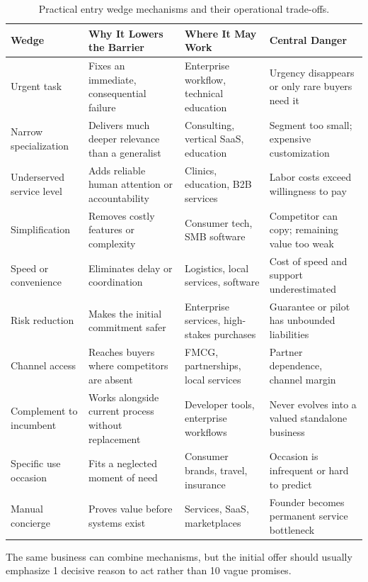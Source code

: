 \begin{table}[t]
\centering
\small
\begin{tabularx}{\textwidth}{l p{4.2cm} p{3.5cm} X}
\toprule
\textbf{Wedge} & \textbf{Why It Lowers the Barrier} & \textbf{Where It May Work} & \textbf{Central Danger} \\
\midrule
Urgent task & Fixes an immediate, consequential failure & Enterprise workflow, technical education & Urgency disappears or only rare buyers need it \\
Narrow specialization & Delivers much deeper relevance than a generalist & Consulting, vertical SaaS, education & Segment too small; expensive customization \\
Underserved service level & Adds reliable human attention or accountability & Clinics, education, B2B services & Labor costs exceed willingness to pay \\
Simplification & Removes costly features or complexity & Consumer tech, SMB software & Competitor can copy; remaining value too weak \\
Speed or convenience & Eliminates delay or coordination & Logistics, local services, software & Cost of speed and support underestimated \\
Risk reduction & Makes the initial commitment safer & Enterprise services, high-stakes purchases & Guarantee or pilot has unbounded liabilities \\
Channel access & Reaches buyers where competitors are absent & FMCG, partnerships, local services & Partner dependence, channel margin \\
Complement to incumbent & Works alongside current process without replacement & Developer tools, enterprise workflows & Never evolves into a valued standalone business \\
Specific use occasion & Fits a neglected moment of need & Consumer brands, travel, insurance & Occasion is infrequent or hard to predict \\
Manual concierge & Proves value before systems exist & Services, SaaS, marketplaces & Founder becomes permanent service bottleneck \\
\bottomrule
\end{tabularx}
\caption{Practical entry wedge mechanisms and their operational trade-offs.}
\label{tab:ch7-wedge-mechanisms}
\end{table}

The same business can combine mechanisms, but the initial offer should usually emphasize 1 decisive reason to act rather than 10 vague promises.

